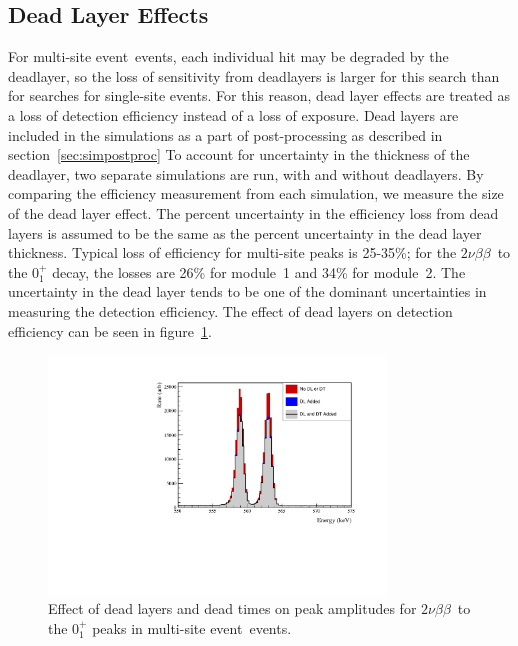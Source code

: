 \documentclass[notitlepage,rmp,aps,10pt]{revtex4-1}
\newcommand{\bb}{${\beta \beta}$}
\newcommand{\tnbb}{${2 \nu \beta \beta}$}
\newcommand{\bbes}{\bb~E.S.}
\newcommand{\SP}[3]{$#1^{#2}_{#3}$}
\newcommand{\msmd}{multi-site event}
\begin{document}
\begin{table}
  \caption[List of subdatasets, livetimes, efficiency and exposure]{\label{tab:subdatasets}
    List of each subdataset with its livetime, detection efficiency measured for the \bbes to \SP{0}{+}{1} decay, and total isotopic exposure. Note the large amount of variance in the detection efficiency.
  }
  \scriptsize
  
\end{table}

\subsection{Dead Layer Effects} \label{sec:DL}
For \msmd\ events, each individual hit may be degraded by the deadlayer, so the loss of sensitivity from deadlayers is larger for this search than for searches for single-site events.
For this reason, dead layer effects are treated as a loss of detection efficiency instead of a loss of exposure.
Dead layers are included in the simulations as a part of post-processing as described in section~\ref{sec:simpostproc}
To account for uncertainty in the thickness of the deadlayer, two separate simulations are run, with and without deadlayers.
By comparing the efficiency measurement from each simulation, we measure the size of the dead layer effect.
The percent uncertainty in the efficiency loss from dead layers is assumed to be the same as the percent uncertainty in the dead layer thickness.
Typical loss of efficiency for multi-site peaks is 25-35\%; for the \tnbb\ to the \SP{0}{+}{1} decay, the losses are 26\% for module~1 and 34\% for module~2.
The uncertainty in the dead layer tends to be one of the dominant uncertainties in measuring the detection efficiency.
The effect of dead layers on detection efficiency can be seen in figure~\ref{fig:dldt}.
\\
\begin{figure}
  \centering
  \includegraphics[width=0.8\textwidth]{DeadLayerDeadTime}
  \caption[Simulated effect of dead layers and dead times]{\label{fig:dldt}
    Effect of dead layers and dead times on peak amplitudes for \tnbb\ to the \SP{0}{+}{1} peaks in \msmd\ events.
  }
\end{figure}
\end{document}
